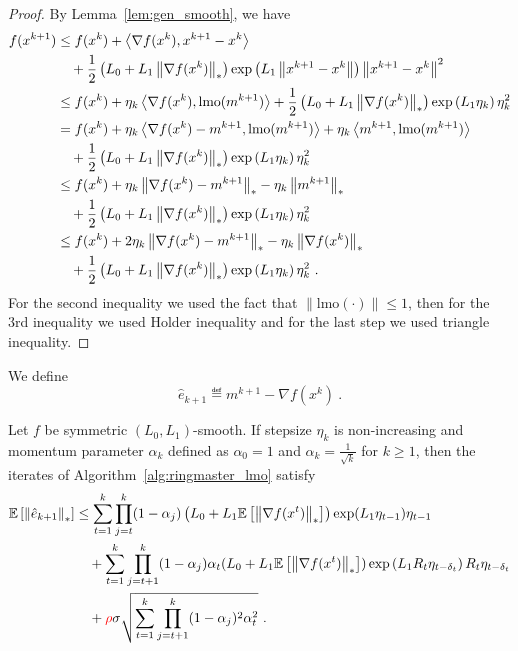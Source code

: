 \documentclass{article}
\begin{document}
\begin{proof}
    By Lemma~\ref{lem:gen_smooth}, we have 
    \begin{align*}
        f(x^{k+1})
        &\le f(x^k) + \left\langle\nabla f(x^k),x^{k+1}-x^k\right\rangle\\
        &\quad +\frac{1}{2}\left(L_0 + L_1\left\| \nabla f(x^k) \right\|_*\right)\exp\left(L_1\left\| x^{k+1}-x^k \right\|\right)\left\| x^{k+1}-x^k \right\|^2\\
        &\le f(x^k) + \eta_k\left\langle\nabla f(x^k),\textrm{lmo}(m^{k+1})\right\rangle +\frac{1}{2}\left(L_0 + L_1\left\| \nabla f(x^k) \right\|_*\right)\exp\left(L_1\eta_k\right)\eta_k^2\\
        &= f(x^k) + \eta_k\left\langle\nabla f(x^k) - m^{k+1},\textrm{lmo}(m^{k+1})\right\rangle + \eta_k\left\langle m^{k+1},\textrm{lmo}(m^{k+1})\right\rangle \\
        &\quad +\frac{1}{2}\left(L_0 + L_1\left\| \nabla f(x^k) \right\|_*\right)\exp\left(L_1\eta_k\right)\eta_k^2\\
        &\le f(x^k) + \eta_k\left\| \nabla f(x^k) - m^{k+1} \right\|_* - \eta_k\left\| m^{k+1} \right\|_*\\
        &\quad + \frac{1}{2}\left(L_0 + L_1\left\| \nabla f(x^k) \right\|_*\right)\exp\left(L_1\eta_k\right)\eta_k^2\\
        &\le f(x^k) + 2\eta_k\left\| \nabla f(x^k) - m^{k+1} \right\|_* - \eta_k\left\| \nabla f(x^k) \right\|_*\\
        &\quad + \frac{1}{2}\left(L_0 + L_1\left\| \nabla f(x^k) \right\|_*\right)\exp\left(L_1\eta_k\right)\eta_k^2 ~.
    \end{align*}
    For the second inequality we used the fact that $\|\mathrm{lmo}(\cdot)\| \le 1$, then for the 3rd inequality we used Holder inequality and for the last step we used triangle inequality.
\end{proof}
%  
% 
We define
$$
\hat{e}_{k+1} \eqdef m^{k+1} - \nabla f(x^k) ~.
$$
\begin{lemma}
\label{lem:error_bound}
    Let $f$ be symmetric $(L_0, L_1)$-smooth.
    If stepsize $\eta_k$ is non-increasing and momentum parameter $\alpha_k$ defined as $\alpha_0 =1$ and $\alpha_k = \frac{1}{\sqrt{k}}$ for $k \ge 1$, then  the iterates of Algorithm~\ref{alg:ringmaster_lmo} satisfy 
    \begin{align*}
        {\mathbb{E}}\left[\left\| \hat{e}_{k+1} \right\|_*\right]
        &\le \sum_{t=1}^k \prod_{j=t}^{k}(1-\alpha_j) \left(L_0 + L_1{\mathbb{E}}\left[\left\| \nabla f(x^t) \right\|_*\right]\right)\exp(L_1\eta_{t-1})\eta_{t-1}\\
            &\quad + \sum_{t=1}^k \prod_{j=t+1}^{k}(1-\alpha_j) \alpha_t (L_0 + L_1 {\mathbb{E}}\left[\left\| \nabla f(x^t) \right\|_*\right])\exp\left(L_1 R_t\eta_{t-\delta_t}\right)R_t\eta_{t-\delta_t}\\
                &\quad + {\color{red} \rho} \sigma\sqrt{\sum_{t=1}^k \prod_{j=t+1}^{k}(1-\alpha_j)^2 \alpha_t^2} ~.
    \end{align*}
\end{lemma}
\end{document}
